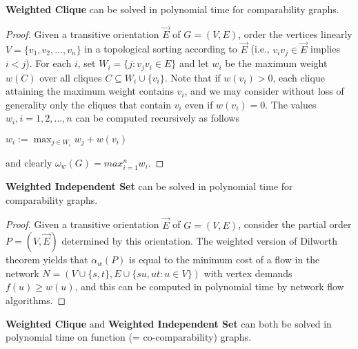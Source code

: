 \begin{thm}
	\textbf{Weighted Clique} can be solved in polynomial time for comparability graphs.
\end{thm}

\begin{proof}
	Given a transitive orientation $\overrightarrow{E}$ of $G = (V, E)$, order the vertices linearly $V = \{v_1 , v_2 , \dots, v_n\}$ in a topological sorting according to $\overrightarrow{E}$ (i.e., $v_i v_j \in \overrightarrow{E}$ implies $i < j$). For each $i$, set $W_i = \{j : v_j v_i \in E\}$ and let $w_i$ be the maximum weight $w(C)$ over all cliques $C \subseteq W_i \cup \{v_i\}$. Note that if $w(v_i) > 0$, each clique attaining the maximum weight contains $v_i$, and we may consider without loss	of generality only the cliques that contain $v_i$ even if $w(v_i) = 0$. The values $w_i , i = 1, 2, \dots , n$ can be computed recursively as follows
	
	\begin{algorithm}[!ht]
		\begin{algorithmic}[1]
				\State $w_i := \max_{j \in W_i} w_j + w(v_i)$
			\EndFor
		\end{algorithmic}
	\end{algorithm}
	
	and clearly $\omega_w(G) = max_{i=1}^n w_i$.
\end{proof}

\begin{thm}
	\textbf{Weighted Independent Set} can be solved in polynomial time for \\ comparability graphs.
	\label{thm-4}
\end{thm}

\begin{proof}
	Given a transitive orientation $\overrightarrow{E}$ of $G = (V, E)$, consider the partial order $P = (V, \overrightarrow{E})$ determined by this orientation. The weighted version of Dilworth theorem yields that $\alpha_w(P)$ is equal to the minimum cost of a flow in the network $N = (V \cup \{s, t\}, E \cup \{su, ut : u \in V\})$ with vertex demands $f(u) \geq w(u)$, and this can be computed in polynomial time by network flow algorithms.
\end{proof}

\begin{cor}
	\textbf{Weighted Clique} and \textbf{Weighted Independent Set} can both be solved in polynomial time on function (= co-comparability) graphs.
\end{cor}

